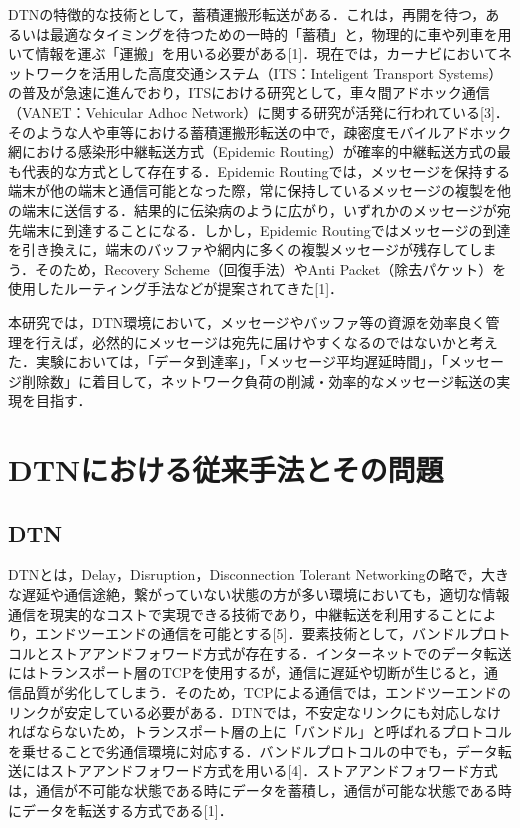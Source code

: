 \documentclass[11pt]{icsthesis}
\begin{document}
DTNの特徴的な技術として，蓄積運搬形転送がある．これは，再開を待つ，あるいは最適なタイミングを待つための一時的「蓄積」と，物理的に車や列車を用いて情報を運ぶ「運搬」を用いる必要がある[1]．現在では，カーナビにおいてネットワークを活用した高度交通システム（ITS：Inteligent Transport Systems）の普及が急速に進んでおり，ITSにおける研究として，車々間アドホック通信（VANET：Vehicular Adhoc Network）に関する研究が活発に行われている[3]．そのような人や車等における蓄積運搬形転送の中で，疎密度モバイルアドホック網における感染形中継転送方式（Epidemic Routing）が確率的中継転送方式の最も代表的な方式として存在する．Epidemic Routingでは，メッセージを保持する端末が他の端末と通信可能となった際，常に保持しているメッセージの複製を他の端末に送信する．結果的に伝染病のように広がり，いずれかのメッセージが宛先端末に到達することになる．しかし，Epidemic Routingではメッセージの到達を引き換えに，端末のバッファや網内に多くの複製メッセージが残存してしまう．そのため，Recovery Scheme（回復手法）やAnti Packet（除去パケット）を使用したルーティング手法などが提案されてきた[1]．

本研究では，DTN環境において，メッセージやバッファ等の資源を効率良く管理を行えば，必然的にメッセージは宛先に届けやすくなるのではないかと考えた．実験においては，「データ到達率」，「メッセージ平均遅延時間」，「メッセージ削除数」に着目して，ネットワーク負荷の削減・効率的なメッセージ転送の実現を目指す．

\chapter{DTNにおける従来手法とその問題}
\section{DTN}
DTNとは，Delay，Disruption，Disconnection Tolerant Networkingの略で，大きな遅延や通信途絶，繋がっていない状態の方が多い環境においても，適切な情報通信を現実的なコストで実現できる技術であり，中継転送を利用することにより，エンドツーエンドの通信を可能とする[5]．要素技術として，バンドルプロトコルとストアアンドフォワード方式が存在する．インターネットでのデータ転送にはトランスポート層のTCPを使用するが，通信に遅延や切断が生じると，通信品質が劣化してしまう．そのため，TCPによる通信では，エンドツーエンドのリンクが安定している必要がある．DTNでは，不安定なリンクにも対応しなければならないため，トランスポート層の上に「バンドル」と呼ばれるプロトコルを乗せることで劣通信環境に対応する．バンドルプロトコルの中でも，データ転送にはストアアンドフォワード方式を用いる[4]．ストアアンドフォワード方式は，通信が不可能な状態である時にデータを蓄積し，通信が可能な状態である時にデータを転送する方式である[1]．
\end{document}
